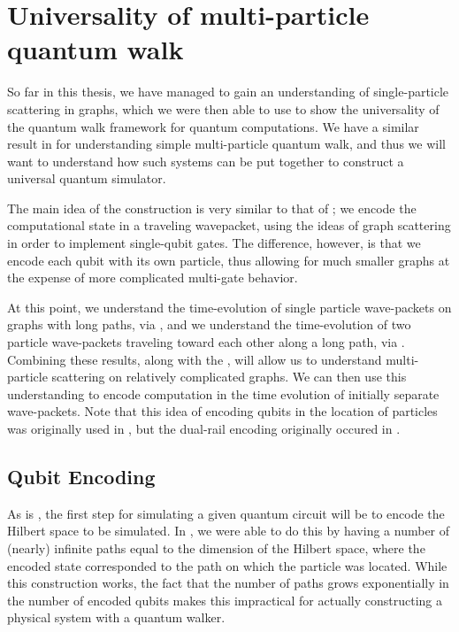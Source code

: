 \documentclass[../thesis-main/thesis-main]{subfiles}
\begin{document}
\chapter{Universality of multi-particle quantum walk}
\label{chap:MP_universality}



So far in this thesis, we have managed to gain an understanding of single-particle scattering in graphs, which we were then able to use to show the universality of the quantum walk framework for quantum computations.  We have a similar result in  for understanding simple multi-particle quantum walk, and thus we will want to understand how such systems can be put together to construct a universal quantum simulator.

The main idea of the construction is very similar to that of ; we encode the computational state in a traveling wavepacket, using the ideas of graph scattering in order to implement single-qubit gates.  The difference, however, is that we encode each qubit with its own particle, thus allowing for much smaller graphs at the expense of more complicated multi-gate behavior.   


At this point, we understand the time-evolution of single particle wave-packets on graphs with long paths, via , and we understand the time-evolution of two particle wave-packets traveling toward each other along a long path, via .  Combining these results, along with the , will allow us to understand multi-particle scattering on relatively complicated graphs.  We can then use this understanding to encode computation in the time evolution of initially separate wave-packets.  Note that this idea of encoding qubits in the location of particles was originally used in \cite{Chi09}, but the dual-rail encoding originally occured in \cite{MPQW}.

%

\section{Qubit Encoding}

As is , the first step for simulating a given quantum circuit will be to encode the Hilbert space to be simulated.  In , we were able to do this by having a number of (nearly) infinite paths equal to the dimension of the Hilbert space,  where the encoded state corresponded to the path on which the particle was located.  While this construction works, the fact that the number of paths grows exponentially in the number of encoded qubits makes this impractical for actually constructing a physical system with a quantum walker.
\end{document}
